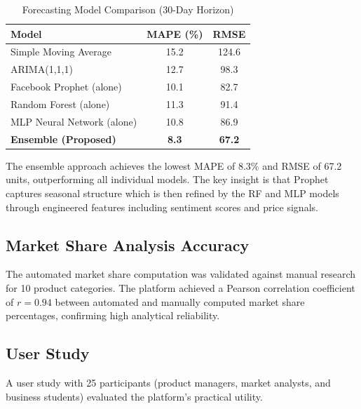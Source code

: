\documentclass[conference]{IEEEtran}
\begin{document}
\begin{table}[htbp]
\caption{Forecasting Model Comparison (30-Day Horizon)}
\begin{center}
\begin{tabular}{lcc}
\toprule
\textbf{Model} & \textbf{MAPE (\%)} & \textbf{RMSE} \\
\midrule
Simple Moving Average & 15.2 & 124.6 \\
ARIMA(1,1,1) & 12.7 & 98.3 \\
Facebook Prophet (alone) & 10.1 & 82.7 \\
Random Forest (alone) & 11.3 & 91.4 \\
MLP Neural Network (alone) & 10.8 & 86.9 \\
\textbf{Ensemble (Proposed)} & \textbf{8.3} & \textbf{67.2} \\
\bottomrule
\end{tabular}
\label{tab:forecast_results}
\end{center}
\end{table}

The ensemble approach achieves the lowest MAPE of 8.3\% and RMSE of 67.2 units, outperforming all individual models. The key insight is that Prophet captures seasonal structure which is then refined by the RF and MLP models through engineered features including sentiment scores and price signals.

\subsection{Market Share Analysis Accuracy}

The automated market share computation was validated against manual research for 10 product categories. The platform achieved a Pearson correlation coefficient of $r = 0.94$ between automated and manually computed market share percentages, confirming high analytical reliability.

\subsection{User Study}

A user study with 25 participants (product managers, market analysts, and business students) evaluated the platform's practical utility.
\end{document}
